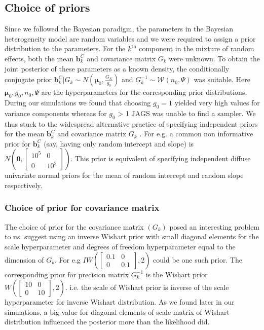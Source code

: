 \subsection{Choice of priors}
\label{subsec : choice_priors}
Since we followed the Bayesian paradigm, the parameters in the Bayesian heterogeneity model are random variables and we were required to assign a prior distribution to the parameters. For the $k^\text{th}$ component in the mixture of random effects, both the mean $\boldsymbol{b}_k^C$ and covariance matrix $G_k$ were unknown. To obtain the joint posterior of these parameters as a known density, the conditionally conjugate prior $\boldsymbol{b}_k^C | G_k \sim N(\boldsymbol{\mu}_0, \frac {G_K} {g_0})$ and $G_k^{-1} \sim \mathcal{W} (n_0, \Psi)$ was suitable. Here $\boldsymbol{\mu}_0, g_0, n_0, \Psi$ are the hyperparameters for the corresponding prior distributions. During our simulations we found that choosing $g_0=1$ yielded very high values for variance components whereas for $g_0$ > 1 JAGS was unable to find a sampler. We thus stuck to the widespread alternative practice of specifying independent priors for the mean $\boldsymbol{b}_k^C$ and covariance matrix $G_k$ \citep[chap. 17]{gelman_data_2006}. For e.g. a common non informative prior for $\boldsymbol{b}_k^C$ (say, having only random intercept and slope) is $N(\boldsymbol{0}, \begin{bmatrix}10^5 & 0 \\ 0 & 10^5\end{bmatrix})$. This prior is equivalent of specifying independent diffuse univariate normal priors for the mean of random intercept and random slope respectively.

\subsubsection{Choice of prior for covariance matrix}
The choice of prior for the covariance matrix $(G_k)$ posed an interesting problem to us. \citet[pg. 260]{lesaffre_bayesian_2012} suggest using an inverse Wishart prior with small diagonal elements for the scale hyperparameter and degrees of freedom hyperparameter equal to the dimension of $G_k$. For e.g $IW(\begin{bmatrix}0.1 & 0 \\ 0 & 0.1\end{bmatrix}, 2)$ could be one such prior. The corresponding prior for precision matrix $G_k^{-1}$ is the Wishart prior $W(\begin{bmatrix}10 & 0 \\ 0 & 10\end{bmatrix}, 2)$. i.e. the scale of Wishart prior is inverse of the scale hyperparameter for inverse Wishart distribution. As we found later in our simulations, a big value for diagonal elements of scale matrix of Wishart distribution influenced the posterior more than the likelihood did.\\

